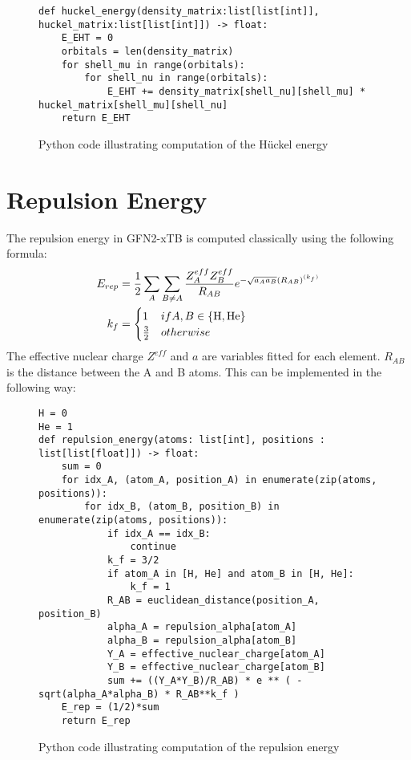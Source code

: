 \begin{figure}[H]
\begin{verbatim}
def huckel_energy(density_matrix:list[list[int]], huckel_matrix:list[list[int]]) -> float:
    E_EHT = 0
    orbitals = len(density_matrix)
    for shell_mu in range(orbitals):
        for shell_nu in range(orbitals):
            E_EHT += density_matrix[shell_nu][shell_mu] * huckel_matrix[shell_mu][shell_nu]
    return E_EHT
\end{verbatim}
\caption{Python code illustrating computation of the Hückel energy}
\end{figure}


\section{Repulsion Energy}
The repulsion energy in GFN2-xTB is computed classically using the following formula:
\begin{align}
    \E{rep} &= \frac{1}{2}\sum_{A}\sum_{B\neq A}\frac{Z^{eff}_A Z^{eff}_B}{R_{AB}}e^{-\sqrt{a_Aa_B}(R_{AB})^{(k_f)}}\\
k_f &= \begin{cases}1 & if A,B\in\{\text{H},\text{He}\}\\\frac{3}{2}&otherwise\end{cases} 
\end{align}
The effective nuclear charge $Z^{eff}$ and $a$ are variables fitted for each element. 
$R_{AB}$ is the distance between the A and B atoms.
This can be implemented in the following way:

\begin{figure}[H]
\begin{verbatim}
H = 0
He = 1
def repulsion_energy(atoms: list[int], positions : list[list[float]]) -> float:
    sum = 0
    for idx_A, (atom_A, position_A) in enumerate(zip(atoms, positions)):
        for idx_B, (atom_B, position_B) in enumerate(zip(atoms, positions)):
            if idx_A == idx_B:
                continue
            k_f = 3/2
            if atom_A in [H, He] and atom_B in [H, He]:
                k_f = 1
            R_AB = euclidean_distance(position_A, position_B)
            alpha_A = repulsion_alpha[atom_A]
            alpha_B = repulsion_alpha[atom_B]
            Y_A = effective_nuclear_charge[atom_A]
            Y_B = effective_nuclear_charge[atom_B]
            sum += ((Y_A*Y_B)/R_AB) * e ** ( - sqrt(alpha_A*alpha_B) * R_AB**k_f )
    E_rep = (1/2)*sum
    return E_rep
\end{verbatim}
\caption{Python code illustrating computation of the repulsion energy}
\end{figure}

